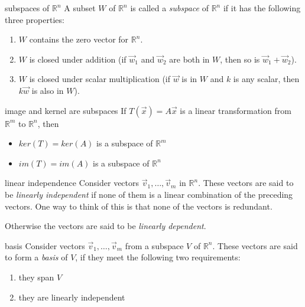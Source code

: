 \documentclass[avery5371,grid,letterpaper]{flashcards}
\newcommand{\Rn}{\mathbb{R}^{n}}
\newcommand{\Rm}{\mathbb{R}^{m}}
\begin{document}
\begin{flashcard}[Definition]{subspaces of $\Rn$}
A subset $W$ of $\Rn$ is called a \textit{subspace} of $\Rn$ if it has
the following three properties:
\begin{enumerate}
\item $W$ contains the zero vector for $\Rn$.
\item $W$ is closed under addition (if $\vec{w}_1$ and $\vec{w}_2$
are both in $W$, then so is $\vec{w}_1 + \vec{w}_2$).
\item $W$ is closed under scalar multiplication (if $\vec{w}$ is in $W$ and $k$ is any scalar, then $k\vec{w}$ is also in $W$).
\end{enumerate}
\end{flashcard}

\begin{flashcard}[Theorem]{image and kernel are subspaces}
If $T(\vec{x}) = A\vec{x}$ is a linear transformation from $\Rm$ to $\Rn$, then
\begin{itemize}
\item $ker(T)= ker(A)$ is a subspace of $\Rm$
\item $im(T) = im(A)$ is a subspace of $\Rn$
\end{itemize}
\end{flashcard}

\begin{flashcard}[Definition]{linear independence}
Consider vectors $\vec{v}_1, \ldots, \vec{v}_m$ in $\Rn$.  These vectors are
said to be \textit{linearly independent} if none of them is a linear combination
of the preceding vectors.  One way to think of this is that none of the vectors
is redundant.

\medskip
Otherwise the vectors are said to be \textit{linearly dependent}.
\end{flashcard}

\begin{flashcard}[Definition]{basis}
Consider vectors $\vec{v}_1, \ldots, \vec{v}_m$ from a subspace $V$ of
$\Rn$.  These vectors are said to form a \textit{basis} of $V$, if they
meet the following two requirements:
\begin{enumerate}
\item they span $V$
\item they are linearly independent
\end{enumerate}
\end{flashcard}
\end{document}
